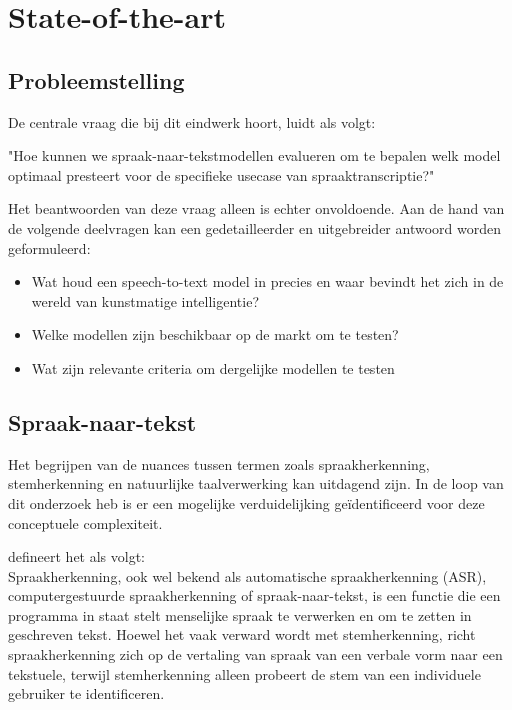 \section{State-of-the-art}%
\label{sec:state-of-the-art}
\subsection{Probleemstelling}


De centrale vraag die bij dit eindwerk hoort, luidt als volgt:

"Hoe kunnen we spraak-naar-tekstmodellen evalueren om te bepalen welk model optimaal presteert voor de specifieke usecase van spraaktranscriptie?"

Het beantwoorden van deze vraag alleen is echter onvoldoende. Aan de hand van de volgende deelvragen kan een gedetailleerder en uitgebreider antwoord worden geformuleerd:

\begin{itemize}
   \item Wat houd een speech-to-text model in precies en waar bevindt het zich in de wereld van kunstmatige intelligentie?
   \item Welke modellen zijn beschikbaar op de markt om te testen?
   \item Wat zijn relevante criteria om dergelijke modellen te testen
\end{itemize}

\subsection{Spraak-naar-tekst}

Het begrijpen van de nuances tussen termen zoals spraakherkenning, stemherkenning en natuurlijke taalverwerking kan uitdagend zijn. In de loop van dit onderzoek heb is er een mogelijke verduidelijking geïdentificeerd voor deze conceptuele complexiteit.

\autocite{IBM} defineert het als volgt: \\Spraakherkenning, ook wel bekend als automatische spraakherkenning (ASR), computergestuurde spraakherkenning of spraak-naar-tekst, is een functie die een programma in staat stelt menselijke spraak te verwerken en om te zetten in geschreven tekst. Hoewel het vaak verward wordt met stemherkenning, richt spraakherkenning zich op de vertaling van spraak van een verbale vorm naar een tekstuele, terwijl stemherkenning alleen probeert de stem van een individuele gebruiker te identificeren.

